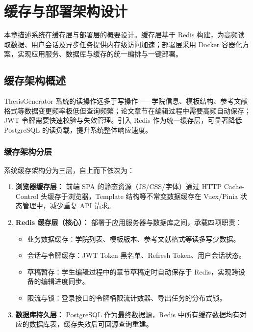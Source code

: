 
\section{缓存与部署架构设计}

本章描述系统在缓存层与部署层的概要设计。缓存层基于 Redis 构建，为高频读取数据、用户会话及异步任务提供内存级访问加速；部署层采用 Docker 容器化方案，实现应用服务、数据库与缓存的统一编排与一键部署。

\subsection{缓存架构概述}

ThesisGenerator 系统的读操作远多于写操作——学院信息、模板结构、参考文献格式等数据变更频率极低但查询频繁；论文章节在编辑过程中需要高频自动保存；JWT 令牌需要快速校验与失效管理。引入 Redis 作为统一缓存层，可显著降低 PostgreSQL 的读负载，提升系统整体响应速度。

\subsubsection{缓存架构分层}

系统缓存架构分为三层，自上而下依次为：

\begin{enumerate}
    \item \textbf{浏览器缓存层：} 前端 SPA 的静态资源（JS/CSS/字体）通过 HTTP Cache-Control 头缓存于浏览器，Template 结构等不常变数据缓存在 Vuex/Pinia 状态管理中，减少重复 API 请求。
    \item \textbf{Redis 缓存层（核心）：} 部署于应用服务器与数据库之间，承载四项职责：
    \begin{itemize}
        \item 业务数据缓存：学院列表、模板版本、参考文献格式等读多写少数据。
        \item 会话与令牌缓存：JWT Token 黑名单、Refresh Token、用户会话状态。
        \item 草稿暂存：学生编辑过程中的章节草稿定时自动保存于 Redis，实现跨设备的编辑进度同步。
        \item 限流与锁：登录接口的令牌桶限流计数器、导出任务的分布式锁。
    \end{itemize}
    \item \textbf{数据库持久层：} PostgreSQL 作为最终数据源，Redis 中所有缓存数据均有对应的数据库表，缓存失效后可回源查询重建。
\end{enumerate}


